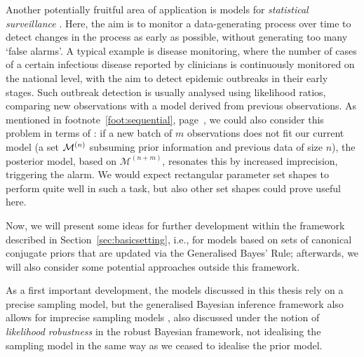 Another potentially fruitful area of application is models for \emph{statistical surveillance}
\parencite[for a brief overview see, e.g.,][]{2011:IESS-surveillance}.
Here, the aim is to monitor a data-generating process over time
to detect changes in the process as early as possible,
without generating too many `false alarms'.
A typical example is disease monitoring,
where the number of cases of a certain infectious disease reported by clinicians
is continuously monitored on the national level,
with the aim to detect epidemic outbreaks in their early stages.
Such outbreak detection is usually analysed using likelihood ratios,
comparing new observations with a model derived from previous observations. 
As mentioned in footnote~\ref{foot:sequential}, page~\pageref{foot:sequential},
we could also consider this problem in terms of \pdc:
if a new batch of $m$ observations does not fit our current model
(a set $\mathcal{M}^{(n)}$ subsuming prior information and previous data of size $n$),
the posterior model, based on $\mathcal{M}^{(n+m)}$, resonates this by increased imprecision,
triggering the alarm.
We would expect rectangular parameter set shapes to perform quite well in such a task,
but also other set shapes could prove useful here.

\medskip

Now, we will present some ideas for further development within the framework
described in Section~\ref{sec:basicsetting}, i.e.,
for models based on sets of canonical conjugate priors
that are updated via the Generalised Bayes' Rule;
afterwards, we will also consider some potential approaches outside this framework.

As a first important development,
the models discussed in this thesis rely on a precise sampling model,
but the generalised Bayesian inference framework also allows for imprecise sampling models
\parencite[see, in particular,][\S 8.5]{1991:walley},
also discussed under the notion of \emph{likelihood robustness} \parencite[e.g.,][]{2000:shyamalkumar} in the robust Bayesian framework,
not idealising the sampling model in the same way as we ceased to idealise the prior model.

